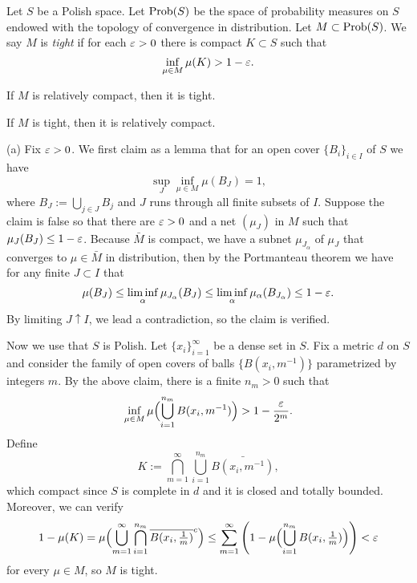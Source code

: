 \documentclass{../../large}
\begin{document}
\begin{prb}
Let $S$ be a Polish space.
Let $\operatorname{Prob}(S)$ be the space of probability measures on $S$ endowed with the topology of convergence in distribution.
Let $M\subset\operatorname{Prob}(S)$.
We say $M$ is \emph{tight} if for each $\varepsilon>0$ there is compact $K\subset S$ such that
\[\inf_{\mu\in M}\mu(K)>1-\varepsilon.\]
\begin{parts}
\item If $M$ is relatively compact, then it is tight.
\item If $M$ is tight, then it is relatively compact.
\end{parts}
\end{prb}
\begin{pf}
(a)
Fix $\varepsilon>0$.
We first claim as a lemma that for an open cover $\{B_i\}_{i\in I}$ of $S$ we have
\[\sup_J\inf_{\mu\in M}\mu(B_J)=1,\]
where $B_J:=\bigcup_{j\in J}B_j$ and $J$ runs through all finite subsets of $I$.
Suppose the claim is false so that there are $\varepsilon>0$ and a net $(\mu_J)$ in $M$ such that $\mu_J(B_J)\le1-\varepsilon$.
Because $\bar M$ is compact, we have a subnet $\mu_{J_\alpha}$ of $\mu_J$ that converges to $\mu\in\bar M$ in distribution, then by the Portmanteau theorem we have for any finite $J\subset I$ that
\[\mu(B_J)\le\liminf_\alpha\mu_{J_\alpha}(B_J)\le\liminf_\alpha\mu_\alpha(B_{J_\alpha})\le1-\varepsilon.\]
By limiting $J\uparrow I$, we lead a contradiction, so the claim is verified.

Now we use that $S$ is Polish.
Let $\{x_i\}_{i=1}^\infty$ be a dense set in $S$.
Fix a metric $d$ on $S$ and consider the family of open covers of balls $\{B(x_i,m^{-1})\}$ parametrized by integers $m$.
By the above claim, there is a finite $n_m>0$ such that
\[\inf_{\mu\in M}\mu\Bigl(\bigcup_{i=1}^{n_m}B(x_i,m^{-1})\Bigr)>1-\frac{\varepsilon}{2^m}.\]
Define
\[K:=\bigcap_{m=1}^\infty\bigcup_{i=1}^{n_m}\bar{B(x_i,m^{-1})},\]
which compact since $S$ is complete in $d$ and it is closed and totally bounded.
Moreover, we can verify
\[1-\mu(K)=\mu\Bigl(\bigcup_{m=1}^\infty\bigcap_{i=1}^{n_m}\overline{B(x_i,\tfrac1m)}^c\Bigr)\le\sum_{m=1}^\infty\left(1-\mu\Bigl(\bigcup_{i=1}^{n_m}B(x_i,\tfrac1m)\Bigr)\right)<\varepsilon\]
for every $\mu\in M$, so $M$ is tight.


\end{pf}
\end{document}
